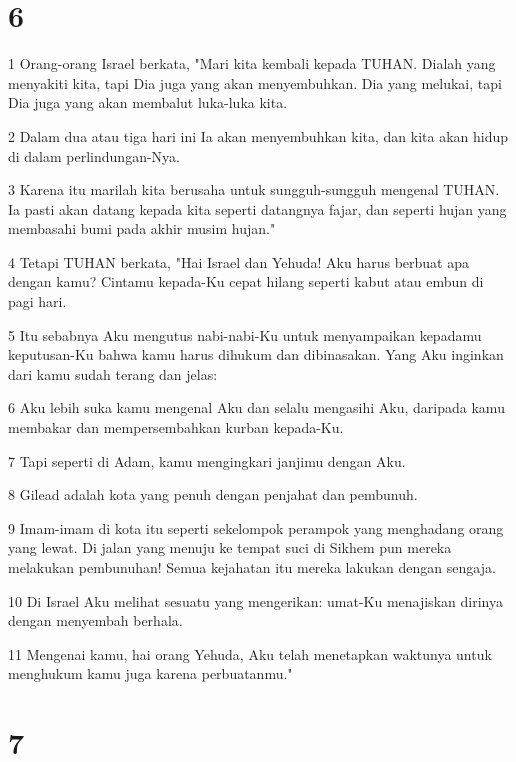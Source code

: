 \chapter{6}

\par 1 Orang-orang Israel berkata, "Mari kita kembali kepada TUHAN. Dialah yang menyakiti kita, tapi Dia juga yang akan menyembuhkan. Dia yang melukai, tapi Dia juga yang akan membalut luka-luka kita.
\par 2 Dalam dua atau tiga hari ini Ia akan menyembuhkan kita, dan kita akan hidup di dalam perlindungan-Nya.
\par 3 Karena itu marilah kita berusaha untuk sungguh-sungguh mengenal TUHAN. Ia pasti akan datang kepada kita seperti datangnya fajar, dan seperti hujan yang membasahi bumi pada akhir musim hujan."
\par 4 Tetapi TUHAN berkata, "Hai Israel dan Yehuda! Aku harus berbuat apa dengan kamu? Cintamu kepada-Ku cepat hilang seperti kabut atau embun di pagi hari.
\par 5 Itu sebabnya Aku mengutus nabi-nabi-Ku untuk menyampaikan kepadamu keputusan-Ku bahwa kamu harus dihukum dan dibinasakan. Yang Aku inginkan dari kamu sudah terang dan jelas:
\par 6 Aku lebih suka kamu mengenal Aku dan selalu mengasihi Aku, daripada kamu membakar dan mempersembahkan kurban kepada-Ku.
\par 7 Tapi seperti di Adam, kamu mengingkari janjimu dengan Aku.
\par 8 Gilead adalah kota yang penuh dengan penjahat dan pembunuh.
\par 9 Imam-imam di kota itu seperti sekelompok perampok yang menghadang orang yang lewat. Di jalan yang menuju ke tempat suci di Sikhem pun mereka melakukan pembunuhan! Semua kejahatan itu mereka lakukan dengan sengaja.
\par 10 Di Israel Aku melihat sesuatu yang mengerikan: umat-Ku menajiskan dirinya dengan menyembah berhala.
\par 11 Mengenai kamu, hai orang Yehuda, Aku telah menetapkan waktunya untuk menghukum kamu juga karena perbuatanmu."

\chapter{7}

